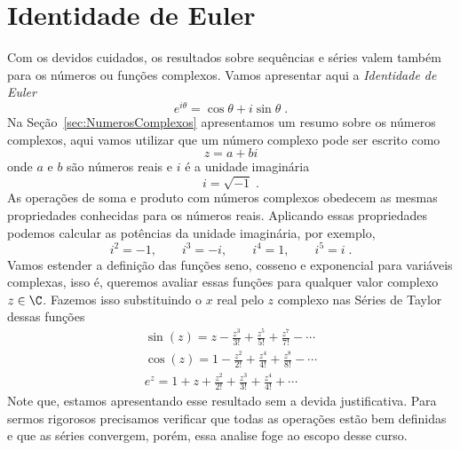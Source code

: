 \section{Identidade de Euler}
\label{sec:identidade_Euler}

Com os devidos cuidados, os resultados sobre sequências e séries
valem também para os números ou funções complexos. Vamos apresentar aqui a
\emph{Identidade de Euler}
\[
e^{i\theta} = \cos\theta + i\sin\theta   \;.
\]
Na Seção~\ref{sec:NumerosComplexos} apresentamos um resumo sobre os
números complexos, aqui vamos utilizar que um número complexo
pode ser escrito como
\[
z = a + bi
\]
onde $a$ e $b$ são números reais e $i$ é a unidade imaginária
\[
i = \sqrt{-1}   \;.
\]
As operações de soma e produto com números complexos obedecem as mesmas
propriedades conhecidas para os números reais. Aplicando essas propriedades
podemos calcular as potências da unidade imaginária, por exemplo,
\[
i^2 = -1, \qquad i^3 = -i, \qquad i^4 = 1, \qquad i^5 = i   \;.
\]
Vamos estender a definição das funções seno, cosseno e exponencial
para variáveis complexas, isso é, queremos avaliar essas funções para qualquer
valor complexo $z\in\C$. Fazemos isso substituindo o $x$ real pelo $z$ complexo
nas Séries de Taylor dessas funções
\begin{gather*}
  \sin(z) = z - \frac{z^3}{3!} + \frac{z^5}{5!} + \frac{z^7}{7!} - \cdots \\[3mm]
  \cos(z) = 1 - \frac{z^2}{2!} + \frac{z^4}{4!} + \frac{z^8}{8!} - \cdots \\[3mm]
  e^z = 1 + z + \frac{z^2}{2!} + \frac{z^3}{3!} + \frac{z^4}{4!} +  \cdots
\end{gather*}
Note que, estamos apresentando esse resultado sem a devida justificativa.
Para sermos rigorosos precisamos verificar que todas as operações estão bem
definidas e que as séries convergem, porém, essa analise foge ao escopo desse curso.

